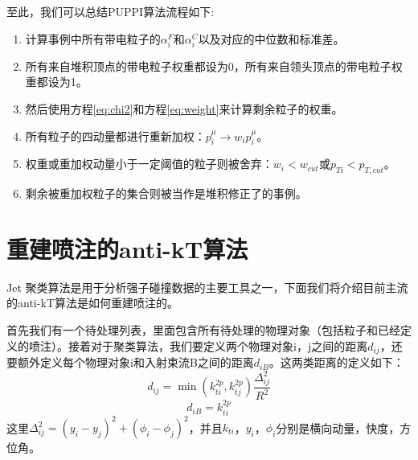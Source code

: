 至此，我们可以总结PUPPI算法流程如下:
\begin{enumerate}
    \item 计算事例中所有带电粒子的$\alpha^F_i$和$\alpha^C_i$以及对应的中位数和标准差。
    \item 所有来自堆积顶点的带电粒子权重都设为0，所有来自领头顶点的带电粒子权重都设为1。
    \item 然后使用方程\eqref{eq:chi2}和方程\eqref{eq:weight}来计算剩余粒子的权重。
    \item 所有粒子的四动量都进行重新加权：$p_i^\mu\to w_ip_i^\mu$。
    \item 权重或重加权动量小于一定阈值的粒子则被舍弃：$w_i<w_{cut}$或$p_{Ti}<p_{T,cut}$。
    \item 剩余被重加权粒子的集合则被当作是堆积修正了的事例。
\end{enumerate}

\section{重建喷注的anti-kT算法}
Jet 聚类算法是用于分析强子碰撞数据的主要工具之一，下面我们将介绍目前主流的anti-kT算法\cite{The_anti-kt_jet_clustering_algorithm}是如何重建喷注的。

首先我们有一个待处理列表，里面包含所有待处理的物理对象（包括粒子和已经定义的喷注）。接着对于聚类算法，我们要定义两个物理对象i，j之间的距离\(d_{ij}\)，还要额外定义每个物理对象i和入射束流B之间的距离$d_{iB}$。这两类距离的定义如下：
\begin{equation}\label{eq:dij}
    d_{ij}=\min(k_{ti}^{2p},k_{tj}^{2p})\frac{\Delta_{ij}^{2}}{R^{2}}
\end{equation}
\begin{equation}\label{eq:diB}
    d_{iB}=k_{ti}^{2p}
\end{equation}
这里$\displaystyle\Delta_{ij}^{2}=(y_{i}-y_{j})^{2}+(\phi_{i}-\phi_{j})^{2}$，并且$k_{ti}$，$y_i$，$\phi_i$分别是横向动量，快度，方位角。%

